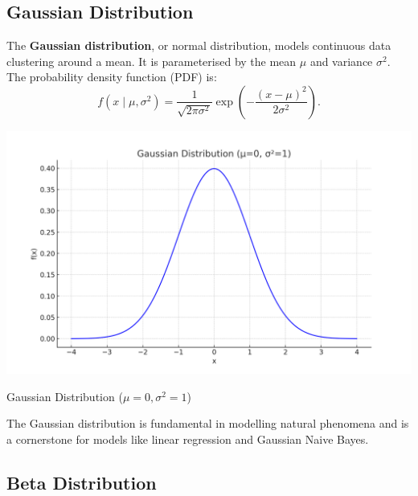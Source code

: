 \subsection{Gaussian Distribution}




The \textbf{Gaussian distribution}, or normal distribution, models continuous data clustering around a mean. It is parameterised by the mean $\mu$ and variance $\sigma^2$. The probability density function (PDF) is:
\[
    f(x \mid \mu, \sigma^2) = \frac{1}{\sqrt{2\pi\sigma^2}} \exp\left(-\frac{(x - \mu)^2}{2\sigma^2}\right).
\]
\begin{marginfigure}
    \includegraphics[width=\linewidth]{img/gaussian_distribution.png}
    \caption{Gaussian Distribution ($\mu=0, \sigma^2 = 1$)}
    \label{fig:gaussian}
\end{marginfigure}
The Gaussian distribution is fundamental in modelling natural phenomena and is a cornerstone for models like linear regression and Gaussian Naive Bayes.

\subsection{Beta Distribution}

